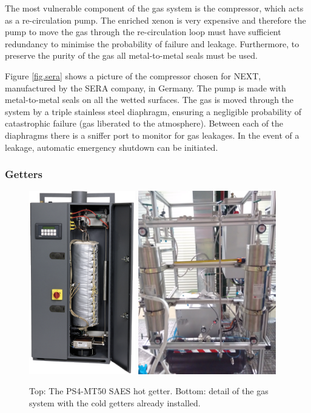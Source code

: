 The most vulnerable component of the gas system is the compressor, which acts as a re-circulation pump. The enriched xenon is very expensive and therefore the pump to move the gas through the re-circulation loop must have sufficient redundancy to minimise the probability of failure and leakage. Furthermore, to preserve the purity of the gas all metal-to-metal seals must be used. 

Figure \ref{fig.sera} shows a picture of the compressor chosen for NEXT, manufactured by the SERA company, in Germany. The pump is made with metal-to-metal seals on all the wetted surfaces. The gas is moved through the system by a triple stainless steel diaphragm, ensuring a negligible probability of catastrophic failure (gas liberated to the atmosphere). Between each of the diaphragms there is a sniffer port to monitor for gas leakages. In the event of a leakage, automatic emergency shutdown can be initiated. 

\subsubsection*{Getters}

\begin{figure}[hpt!]
\centering
\includegraphics[height=8cm]{img2/HotGetter.png}
\includegraphics[height=8cm]{img2/ColdGetters.png}
\caption{Top: The PS4-MT50 SAES hot getter. Bottom: detail of the gas system with the cold getters already installed.} \label{fig:getter}
\end{figure}


